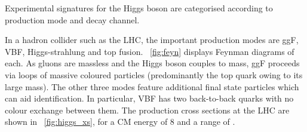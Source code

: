 
Experimental signatures for the Higgs boson are categorised according to production 
mode and decay channel.

In a hadron collider such as the \ac{LHC}, the important production modes are \ac{ggF},
\ac{VBF}, Higgs-strahlung and top fusion. \Figure~\ref{fig:feyn} displays Feynman diagrams 
of each. As gluons are massless and the Higgs boson couples to mass, \ac{ggF} proceeds via 
loops of massive coloured particles (predominantly the top quark owing to its large mass). 
The other three modes feature additional final state particles which can aid 
identification. In particular, \ac{VBF} has two back-to-back quarks with no colour 
exchange between them. The production cross sections at the \ac{LHC} are shown in
\Figure~\ref{fig:higgs_xs}, for a \ac{CM} energy of \unit{8}{\TeV} and a range of \mH.

